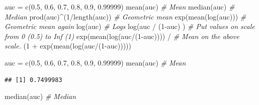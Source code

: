 \documentclass[
]{book}
\newenvironment{Shaded}{\begin{snugshade}}{\end{snugshade}}
\newcommand{\CommentTok}[1]{\textcolor[rgb]{0.56,0.35,0.01}{\textit{#1}}}
\newcommand{\DecValTok}[1]{\textcolor[rgb]{0.00,0.00,0.81}{#1}}
\newcommand{\FloatTok}[1]{\textcolor[rgb]{0.00,0.00,0.81}{#1}}
\newcommand{\FunctionTok}[1]{\textcolor[rgb]{0.00,0.00,0.00}{#1}}
\newcommand{\NormalTok}[1]{#1}
\newcommand{\OtherTok}[1]{\textcolor[rgb]{0.56,0.35,0.01}{#1}}
\newcommand{\SpecialCharTok}[1]{\textcolor[rgb]{0.00,0.00,0.00}{#1}}
\begin{document}
\begin{Shaded}
\begin{Highlighting}[]
\NormalTok{auc }\OtherTok{=} \FunctionTok{c}\NormalTok{(}\FloatTok{0.5}\NormalTok{, }\FloatTok{0.6}\NormalTok{, }\FloatTok{0.7}\NormalTok{, }\FloatTok{0.8}\NormalTok{, }\FloatTok{0.9}\NormalTok{, }\FloatTok{0.99999}\NormalTok{)}
\FunctionTok{mean}\NormalTok{(auc)                       }\CommentTok{\# Mean }
\FunctionTok{median}\NormalTok{(auc)                     }\CommentTok{\# Median}
\FunctionTok{prod}\NormalTok{(auc)}\SpecialCharTok{\^{}}\NormalTok{(}\DecValTok{1}\SpecialCharTok{/}\FunctionTok{length}\NormalTok{(auc))       }\CommentTok{\# Geometric mean}
\FunctionTok{exp}\NormalTok{(}\FunctionTok{mean}\NormalTok{(}\FunctionTok{log}\NormalTok{(auc)))             }\CommentTok{\# Geometric mean again}
\FunctionTok{log}\NormalTok{(auc)                        }\CommentTok{\# Logs}
\FunctionTok{log}\NormalTok{(auc }\SpecialCharTok{/}\NormalTok{ (}\DecValTok{1}\SpecialCharTok{{-}}\NormalTok{auc) )             }\CommentTok{\# Put values on scale from 0 (0.5) to Inf (1)}
\FunctionTok{exp}\NormalTok{(}\FunctionTok{mean}\NormalTok{(}\FunctionTok{log}\NormalTok{(auc}\SpecialCharTok{/}\NormalTok{(}\DecValTok{1}\SpecialCharTok{{-}}\NormalTok{auc)))) }\SpecialCharTok{/}   \CommentTok{\# Mean on the above scale. }
\NormalTok{  (}\DecValTok{1} \SpecialCharTok{+} \FunctionTok{exp}\NormalTok{(}\FunctionTok{mean}\NormalTok{(}\FunctionTok{log}\NormalTok{(auc}\SpecialCharTok{/}\NormalTok{(}\DecValTok{1}\SpecialCharTok{{-}}\NormalTok{auc)))))}
\end{Highlighting}
\end{Shaded}

\begin{Shaded}
\begin{Highlighting}[]
\NormalTok{auc }\OtherTok{=} \FunctionTok{c}\NormalTok{(}\FloatTok{0.5}\NormalTok{, }\FloatTok{0.6}\NormalTok{, }\FloatTok{0.7}\NormalTok{, }\FloatTok{0.8}\NormalTok{, }\FloatTok{0.9}\NormalTok{, }\FloatTok{0.99999}\NormalTok{)}
\FunctionTok{mean}\NormalTok{(auc)                       }\CommentTok{\# Mean }
\end{Highlighting}
\end{Shaded}

\begin{verbatim}
## [1] 0.7499983
\end{verbatim}

\begin{Shaded}
\begin{Highlighting}[]
\FunctionTok{median}\NormalTok{(auc)                     }\CommentTok{\# Median}
\end{Highlighting}
\end{Shaded}
\end{document}
